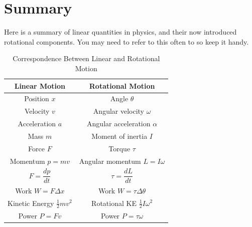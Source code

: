 \section{Summary}
Here is a summary of linear quantities in physics, and their now introduced rotational components. You may need to refer to this often to so keep it handy.
\begin{table}[H]
\centering
\renewcommand{\arraystretch}{1.5}
\caption{Correspondence Between Linear and Rotational Motion}
\label{tab:linear_rotational_analogy}
\begin{tabular}{|c|c|}
\hline
\textbf{Linear Motion} & \textbf{Rotational Motion} \\
\hline
Position $x$ & Angle $\theta$ \\
\hline
Velocity $v$ & Angular velocity $\omega$ \\
\hline
Acceleration $a$ & Angular acceleration $\alpha$ \\
\hline
Mass $m$ & Moment of inertia $I$ \\
\hline
Force $F$ & Torque $\tau$ \\
\hline
Momentum $p = mv$ & Angular momentum $L = I\omega$ \\
\hline
$F = \dfrac{dp}{dt}$ & $\tau = \dfrac{dL}{dt}$ \\
\hline
Work $W = F \Delta x$ & Work $W = \tau \Delta \theta$ \\
\hline
Kinetic Energy $\tfrac{1}{2}mv^2$ & Rotational KE $\tfrac{1}{2}I\omega^2$ \\
\hline
Power $P = Fv$ & Power $P = \tau \omega$ \\
\hline
\end{tabular}
\end{table}
